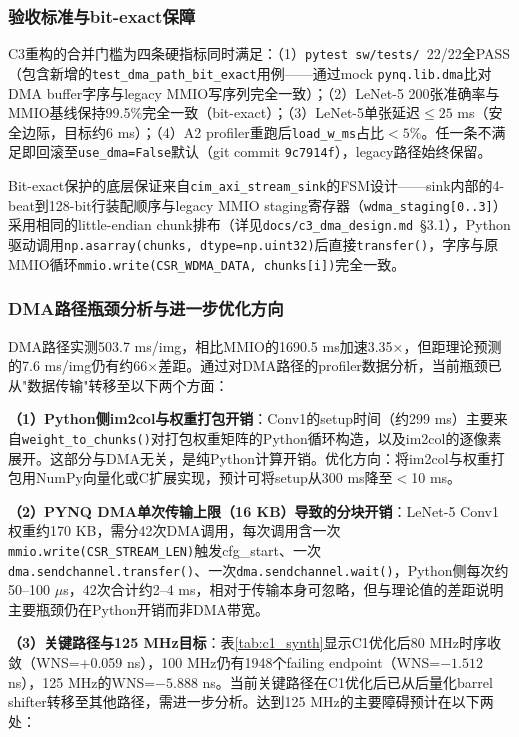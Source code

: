 \documentclass[12pt, a4paper]{article}
\begin{document}
\subsubsection{验收标准与bit-exact保障}

C3重构的合并门槛为四条硬指标同时满足：（1）\texttt{pytest sw/tests/}~22/22全PASS（包含新增的\texttt{test\_dma\_path\_bit\_exact}用例——通过mock \texttt{pynq.lib.dma}比对DMA buffer字序与legacy MMIO写序列完全一致）；（2）LeNet-5 200张准确率与MMIO基线保持99.5\%完全一致（bit-exact）；（3）LeNet-5单张延迟$\leq 25$ ms（安全边际，目标约6 ms）；（4）A2 profiler重跑后\texttt{load\_w\_ms}占比$<5\%$。任一条不满足即回滚至\texttt{use\_dma=False}默认（git commit \texttt{9c7914f}），legacy路径始终保留。

Bit-exact保护的底层保证来自\texttt{cim\_axi\_stream\_sink}的FSM设计——sink内部的4-beat到128-bit行装配顺序与legacy MMIO staging寄存器（\texttt{wdma\_staging[0..3]}）采用相同的little-endian chunk排布（详见\texttt{docs/c3\_dma\_design.md}~§3.1），Python驱动调用\texttt{np.asarray(chunks, dtype=np.uint32)}后直接\texttt{transfer()}，字序与原MMIO循环\texttt{mmio.write(CSR\_WDMA\_DATA, chunks[i])}完全一致。

\subsubsection{DMA路径瓶颈分析与进一步优化方向}
\label{sec:c3_bottleneck}

DMA路径实测503.7 ms/img，相比MMIO的1690.5 ms加速3.35×，但距理论预测的7.6 ms/img仍有约66×差距。通过对DMA路径的profiler数据分析，当前瓶颈已从"数据传输"转移至以下两个方面：

\textbf{（1）Python侧im2col与权重打包开销}：Conv1的setup时间（约299 ms）主要来自\texttt{weight\_to\_chunks()}对打包权重矩阵的Python循环构造，以及im2col的逐像素展开。这部分与DMA无关，是纯Python计算开销。优化方向：将im2col与权重打包用NumPy向量化或C扩展实现，预计可将setup从300 ms降至$<$10 ms。

\textbf{（2）PYNQ DMA单次传输上限（16 KB）导致的分块开销}：LeNet-5 Conv1权重约170 KB，需分42次DMA调用，每次调用含一次\texttt{mmio.write(CSR\_STREAM\_LEN)}触发cfg\_start、一次\texttt{dma.sendchannel.transfer()}、一次\texttt{dma.sendchannel.wait()}，Python侧每次约50--100 $\mu$s，42次合计约2--4 ms，相对于传输本身可忽略，但与理论值的差距说明主要瓶颈仍在Python开销而非DMA带宽。

\textbf{（3）关键路径与125 MHz目标}：表\ref{tab:c1_synth}显示C1优化后80 MHz时序收敛（WNS=+0.059 ns），100 MHz仍有1948个failing endpoint（WNS=$-1.512$ ns），125 MHz的WNS=$-5.888$ ns。当前关键路径在C1优化后已从后量化barrel shifter转移至其他路径，需进一步分析。达到125 MHz的主要障碍预计在以下两处：
\end{document}

